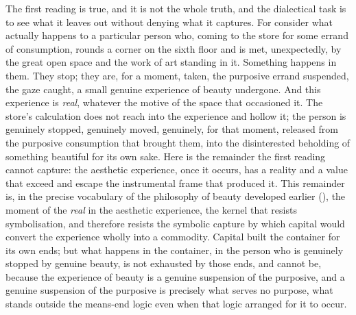 The first reading is true, and it is not the whole truth, and the dialectical task is to see what it leaves out without denying what it captures. For consider what actually happens to a particular person who, coming to the store for some errand of consumption, rounds a corner on the sixth floor and is met, unexpectedly, by the great open space and the work of art standing in it. Something happens in them. They stop; they are, for a moment, taken, the purposive errand suspended, the gaze caught, a small genuine experience of beauty undergone. And this experience is \emph{real}, whatever the motive of the space that occasioned it. The store's calculation does not reach into the experience and hollow it; the person is genuinely stopped, genuinely moved, genuinely, for that moment, released from the purposive consumption that brought them, into the disinterested beholding of something beautiful for its own sake. Here is the remainder the first reading cannot capture: the aesthetic experience, once it occurs, has a reality and a value that exceed and escape the instrumental frame that produced it. This remainder is, in the precise vocabulary of the philosophy of beauty developed earlier (), the moment of the \emph{real} in the aesthetic experience, the kernel that resists symbolisation, and therefore resists the symbolic capture by which capital would convert the experience wholly into a commodity. Capital built the container for its own ends; but what happens in the container, in the person who is genuinely stopped by genuine beauty, is not exhausted by those ends, and cannot be, because the experience of beauty is a genuine suspension of the purposive, and a genuine suspension of the purposive is precisely what serves no purpose, what stands outside the means-end logic even when that logic arranged for it to occur.

